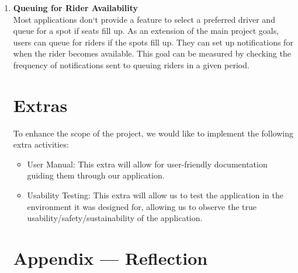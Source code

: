 \documentclass{article}
\begin{document}
\begin{enumerate}
\item \textbf{Queuing for Rider Availability}\\
Most applications don`t provide a feature to select a preferred driver and queue for a spot if seats fill up. As an extension of the main project goals, users can queue for riders if the spots fill up. They can set up notifications for when the rider becomes available. This goal can be measured by checking the frequency of notifications sent to queuing riders in a given period. 

\section{Extras} 

To enhance the scope of the project, we would like to implement the following extra
activities:
\begin{itemize}
\item User Manual: This extra will allow for user-friendly documentation guiding them 
through our application.
\item Usability Testing: This extra will allow us to test the application in the environment
it was designed for, allowing us to observe the true usability/safety/sustainability of the application.
\end{itemize}


\newpage{}

\section*{Appendix --- Reflection}





\end{enumerate}
\end{document}
